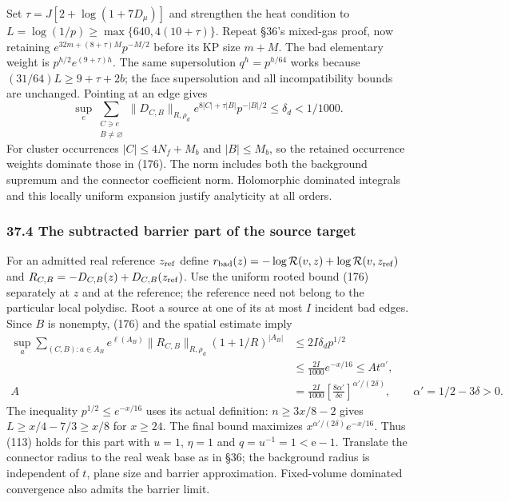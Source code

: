 \documentclass[11pt,a4paper]{article}
\begin{document}
Set \(\tau=J[2+\log(1+7D_\mu)]\) and strengthen the heat condition to
\(L=\log(1/p)\ge\max\{640,4(10+\tau)\}\). Repeat §36's mixed-gas proof,
now retaining \(e^{32m+(8+\tau)M}p^{-M/2}\) before its KP size \(m+M\).
The bad elementary weight is \(p^{h/2}e^{(9+\tau)h}\). The same
supersolution \(q^h=p^{h/64}\) works because \((31/64)L\ge9+\tau+2b\);
the face supersolution and all incompatibility bounds are unchanged.
Pointing at an edge gives
\[\sup_e\sum_{\substack{C\ni e\\B\ne\varnothing}}
 \|D_{C,B}\|_{R,\rho_d}
 e^{8|C|+\tau|B|}p^{-|B|/2}\le\delta_d<1/1000.
\tag{176}\] For cluster occurrences \(|C|\le4N_f+M_b\) and
\(|B|\le M_b\), so the retained occurrence weights dominate those in
(176). The norm includes both the background supremum and the connector
coefficient norm. Holomorphic dominated integrals and this locally
uniform expansion justify analyticity at all orders.

\hypertarget{the-subtracted-barrier-part-of-the-source-target}{%
\subsubsection{37.4 The subtracted barrier part of the source
target}\label{the-subtracted-barrier-part-of-the-source-target}}

For an admitted real reference \(z_{\rm ref}\) define
\(r_{\rm bad}(z)=-\log\mathcal R(v,z)+\log\mathcal R(v,z_{\rm ref})\)
and \(R_{C,B}=-D_{C,B}(z)+D_{C,B}(z_{\rm ref})\). Use the uniform rooted
bound (176) separately at \(z\) and at the reference; the reference need
not belong to the particular local polydisc. Root a source at one of its
at most \(I\) incident bad edges. Since \(B\) is nonempty, (176) and the
spatial estimate imply \[\begin{aligned}
\sup_a\sum_{(C,B):a\in A_B}
 e^{\ell(A_B)}\|R_{C,B}\|_{R,\rho_d}
 (1+1/R)^{|A_B|}
 &\le2I\delta_d p^{1/2}\\
 &\le\frac{2I}{1000}e^{-x/16}
 \le A t^{\alpha'},\\
A&=\frac{2I}{1000}
 \left[\frac{8\alpha'}{\delta\mathrm e}\right]^{\alpha'/(2\delta)},
 \qquad \alpha'=1/2-3\delta>0.
\end{aligned}\tag{177}\] The inequality \(p^{1/2}\le e^{-x/16}\) uses
its actual definition: \(n\ge3x/8-2\) gives \(L\ge x/4-7/3\ge x/8\) for
\(x\ge24\). The final bound maximizes
\(x^{\alpha'/(2\delta)}e^{-x/16}\). Thus (113) holds for this part with
\(u=1\), \(\eta=1\) and \(q=u^{-1}=1<\mathrm e-1\). Translate the
connector radius to the real weak base as in §36; the background radius
is independent of \(t\), plane size and barrier approximation.
Fixed-volume dominated convergence also admits the barrier limit.
\end{document}
